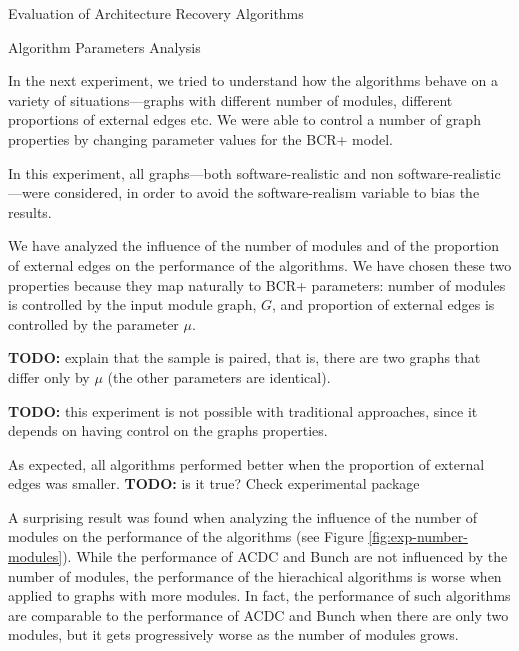 \documentclass[11pt,twocolumn,a4paper,english]{article}
\newcommand{\TODO}{\textbf{TODO:} }
\begin{document}
\begin{section}{Evaluation of Architecture Recovery Algorithms}
\begin{subsection}{Algorithm Parameters Analysis}
	
	In the next experiment, we tried to understand how the algorithms behave on a variety of situations---graphs with different number of modules, different proportions of external edges etc. We were able to control a number of graph properties by changing parameter values for the BCR+ model.
	
	In this experiment, all graphs---both software-realistic and non software-realistic---were considered, in order to avoid the software-realism variable to bias the results.
	
	We have analyzed the influence of the number of modules and of the proportion of external edges on the performance of the algorithms. We have chosen these two properties because they map naturally to BCR+ parameters: number of modules is controlled by the input module graph, $G$, and proportion of external edges is controlled by the parameter $\mu$.

	\TODO explain that the sample is paired, that is, there are two graphs that differ only by $\mu$ (the other parameters are identical).
	
	\TODO this experiment is not possible with traditional approaches, since it depends on having control on the graphs properties.
	
	As expected, all algorithms performed better when the proportion of external edges was smaller. \TODO is it true? Check experimental package
	
	A surprising result was found when analyzing the influence of the number of modules on the performance of the algorithms (see Figure \ref{fig:exp-number-modules}). While the performance of ACDC and Bunch are not influenced by the number of modules, the performance of the hierachical algorithms is worse when applied to graphs with more modules. In fact, the performance of such algorithms are comparable to the performance of ACDC and Bunch when there are only two modules, but it gets  progressively worse as the number of modules grows.
	

\end{subsection}
\end{section}
\end{document}
